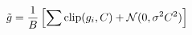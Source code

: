 \documentclass[preview]{standalone}
\begin{document}
\begin{align*}
\special{dvisvgm:raw <g id='unique000'>}\tilde{g} = \frac{1}{B}\left[\sum \text{clip}(g_i, C) + \mathcal{N}(0, \sigma^2 C^2)\right]\special{dvisvgm:raw </g>}
\end{align*}
\end{document}
